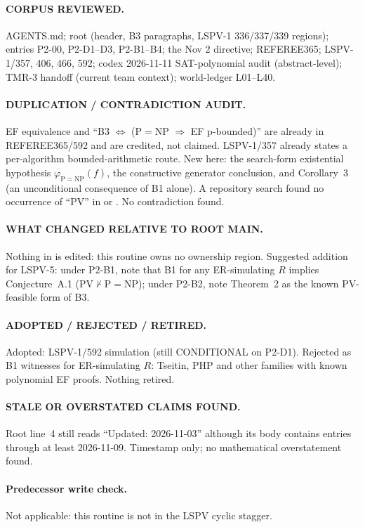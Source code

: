 \documentclass[11pt]{article}
\begin{document}
\paragraph{CORPUS REVIEWED.} AGENTS.md; root  (header, B3
paragraphs, LSPV-1 336/337/339 regions);  entries P2-00,
P2-D1--D3, P2-B1--B4; the Nov 2 directive; REFEREE365; LSPV-1/357, 406, 466,
592; codex 2026-11-11 SAT-polynomial audit (abstract-level); TMR-3 handoff
(current team context); world-ledger L01--L40.
\paragraph{DUPLICATION / CONTRADICTION AUDIT.} EF equivalence and
``B3 $\Leftrightarrow$ (P$=$NP $\Rightarrow$ EF p-bounded)'' are already in
REFEREE365/592 and are credited, not claimed. LSPV-1/357 already states a
per-algorithm bounded-arithmetic route. New here: the search-form existential
hypothesis $\varphi_{\mathrm{P=NP}}(f)$, the constructive generator conclusion,
and Corollary~3 (an unconditional consequence of B1 alone). A repository search
found no occurrence of ``PV'' in  or . No
contradiction found.
\paragraph{WHAT CHANGED RELATIVE TO ROOT MAIN.} Nothing in 
is edited: this routine owns no ownership region. Suggested addition for
LSPV-5: under P2-B1, note that B1 for any ER-simulating $R$ implies
Conjecture~A.1 (PV$\nvdash$P$=$NP); under P2-B2, note Theorem~2 as the known
PV-feasible form of B3.
\paragraph{ADOPTED / REJECTED / RETIRED.} Adopted: LSPV-1/592 simulation (still
CONDITIONAL on P2-D1). Rejected as B1 witnesses for ER-simulating $R$: Tseitin,
PHP and other families with known polynomial EF proofs. Nothing retired.
\paragraph{STALE OR OVERSTATED CLAIMS FOUND.} Root  line~4
still reads ``Updated: 2026-11-03'' although its body contains entries through
at least 2026-11-09. Timestamp only; no mathematical overstatement found.
\paragraph{Predecessor write check.} Not applicable: this routine is not in the
LSPV cyclic stagger.
\end{document}
